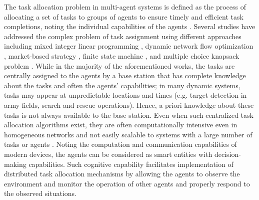 \documentclass[conference]{IEEEtran}
\theoremstyle{remark}
\theoremstyle{lemma}
\begin{document}
The task allocation problem in multi-agent systems is defined as the process of allocating a set of tasks to groups of agents to ensure timely and efficient task completions, noting the individual capabilities of the agents \cite{Korsah}. Several studies have addressed the complex problem of task assignment using different approaches including mixed integer linear programming \cite{Schumacher,Darrah}, dynamic network flow optimization \cite{Schumacher2,Schumacher3}, market-based strategy \cite{Dias,Gerkey}, finite state machine \cite{Zhong}, and multiple choice knapsack problem \cite{Alighanbaril}.
While in the majority of the aforementioned works, the tasks are centrally assigned to the agents by a base station that has complete knowledge about the tasks and often the agents' capabilities; in many dynamic systems, tasks may appear at unpredictable locations and times (e.g. target detection in army fields, search and rescue operations). Hence, a priori knowledge about these tasks is not always available to the base station. Even when such centralized task allocation algorithms exist, they are often computationally intensive even in homogeneous networks and not easily scalable to systems with a large number of tasks or agents \cite{Zhang}. Noting the computation and communication capabilities of modern devices, the agents can be considered as smart entities with decision-making capabilities. Such cognitive capability facilitates implementation of distributed task allocation mechanisms by allowing the agents to observe the environment and monitor the operation of other agents and properly respond to the observed situations.
\end{document}
